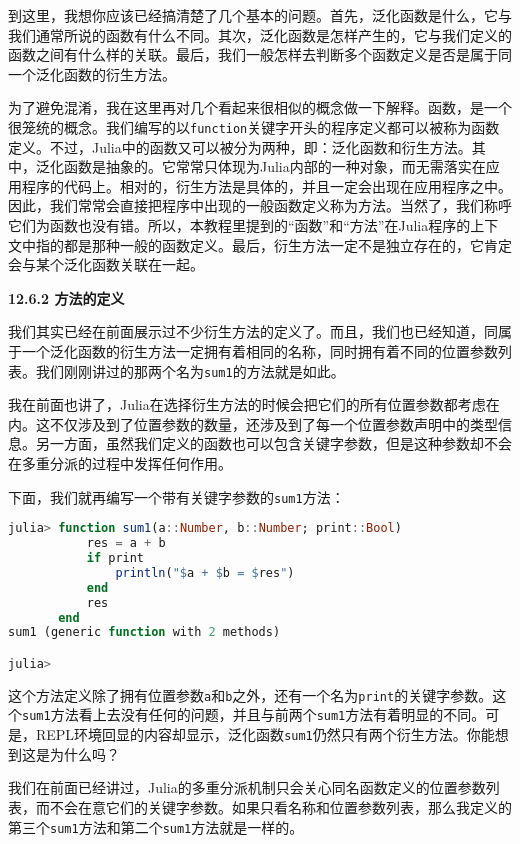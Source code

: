 到这里，我想你应该已经搞清楚了几个基本的问题。首先，泛化函数是什么，它与我们通常所说的函数有什么不同。其次，泛化函数是怎样产生的，它与我们定义的函数之间有什么样的关联。最后，我们一般怎样去判断多个函数定义是否是属于同一个泛化函数的衍生方法。

为了避免混淆，我在这里再对几个看起来很相似的概念做一下解释。函数，是一个很笼统的概念。我们编写的以\verb`function`关键字开头的程序定义都可以被称为函数定义。不过，Julia中的函数又可以被分为两种，即：泛化函数和衍生方法。其中，泛化函数是抽象的。它常常只体现为Julia内部的一种对象，而无需落实在应用程序的代码上。相对的，衍生方法是具体的，并且一定会出现在应用程序之中。因此，我们常常会直接把程序中出现的一般函数定义称为方法。当然了，我们称呼它们为函数也没有错。所以，本教程里提到的“函数”和“方法”在Julia程序的上下文中指的都是那种一般的函数定义。最后，衍生方法一定不是独立存在的，它肯定会与某个泛化函数关联在一起。

\textbf{12.6.2 方法的定义}

我们其实已经在前面展示过不少衍生方法的定义了。而且，我们也已经知道，同属于一个泛化函数的衍生方法一定拥有着相同的名称，同时拥有着不同的位置参数列表。我们刚刚讲过的那两个名为\verb`sum1`的方法就是如此。

我在前面也讲了，Julia在选择衍生方法的时候会把它们的所有位置参数都考虑在内。这不仅涉及到了位置参数的数量，还涉及到了每一个位置参数声明中的类型信息。另一方面，虽然我们定义的函数也可以包含关键字参数，但是这种参数却不会在多重分派的过程中发挥任何作用。

下面，我们就再编写一个带有关键字参数的\verb`sum1`方法：

\begin{lstlisting}[language=julia]
julia> function sum1(a::Number, b::Number; print::Bool)
           res = a + b
           if print
               println("$a + $b = $res")
           end
           res
       end
sum1 (generic function with 2 methods)

julia>
\end{lstlisting}

这个方法定义除了拥有位置参数\verb`a`和\verb`b`之外，还有一个名为\verb`print`的关键字参数。这个\verb`sum1`方法看上去没有任何的问题，并且与前两个\verb`sum1`方法有着明显的不同。可是，REPL环境回显的内容却显示，泛化函数\verb`sum1`仍然只有两个衍生方法。你能想到这是为什么吗？

我们在前面已经讲过，Julia的多重分派机制只会关心同名函数定义的位置参数列表，而不会在意它们的关键字参数。如果只看名称和位置参数列表，那么我定义的第三个\verb`sum1`方法和第二个\verb`sum1`方法就是一样的。

